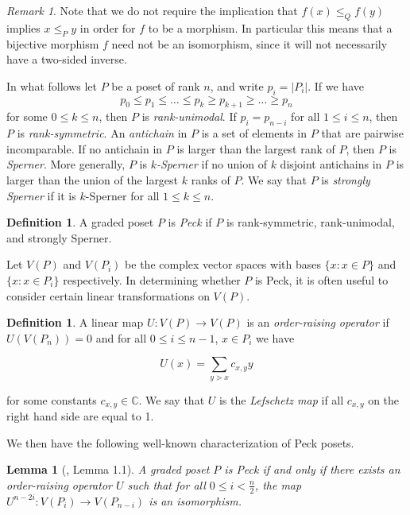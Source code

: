 \documentclass[smallextended, envcountsame, numbook]{svjour3}
\theoremstyle{plain}
\newtheorem{lem}[thm]{Lemma}
\theoremstyle{definition}
\newtheorem{defn}[thm]{Definition}
\theoremstyle{remark}
\newtheorem{rmk}[thm]{Remark}
\numberwithin{equation}{section}
\begin{document}
\begin{rmk}\label{rem:bijective_morphism_not_isomorphism}
Note that we do not require the implication that $f(x)\le_Q f(y)$ implies $x\le_P y$ in order for $f$ to be a morphism.  In particular this means that a bijective morphism $f$ need not be an isomorphism, since it will not necessarily have a two-sided inverse.  
\end{rmk}


In what follows let $P$ be a poset of rank $n$, and write $p_i = |P_i|$.  If we have
$$p_0\le p_1\le \ldots \le p_k \ge p_{k+1} \ge\ldots \ge p_n$$
for some $0\le k\le n$, then $P$ is \textit{rank-unimodal}. If $p_i = p_{n-i}$ for all $1\le i\le n$, then $P$ is \textit{rank-symmetric}.  An \textit{antichain} in $P$ is a set of elements in $P$ that are pairwise incomparable.  If no antichain in $P$ is larger than the largest rank of $P$, then $P$ is \textit{Sperner}.  More generally, $P$ is \textit{$k$-Sperner} if no union of $k$ disjoint antichains in $P$ is larger than the union of the largest $k$ ranks of $P$. We say that $P$ is \textit{strongly Sperner} if it is $k$-Sperner for all $1\le k\le n$.

\begin{defn}
	\label{defn:peck}
A graded poset $P$ is \textit{Peck} if $P$ is rank-symmetric, rank-unimodal, and strongly Sperner.
\end{defn}


Let $V(P)$ and $V(P_i)$ be the complex vector spaces with bases $\{x :x\in P\}$ and $\{x :x\in P_i\}$ respectively. In determining whether $P$ is Peck, it is often useful to consider certain linear transformations on $V(P)$.

\begin{defn}
\label{defn:lefschetz}
A linear map $U\colon V(P)\rightarrow V(P)$ is an \textit{order-raising operator} if $U(V(P_n)) = 0$ and for all $0\le i\le n-1$, $x\in P_i$ we have

$$U(x) = \sum_{y\gtrdot x} c_{x,y}y$$

\noindent for some constants $c_{x,y}\in \mathbb{C}$.  We say that $U$ is the \textit{Lefschetz map} if all $c_{x,y}$ on the right hand side are equal to 1.
\end{defn}

\noindent We then have the following well-known characterization of Peck posets.

\begin{lem}[\cite{weyl_groups_stanley}, Lemma 1.1]\label{lem:Peck_poset_characterization}
A graded poset $P$ is Peck if and only if there exists an order-raising operator $U$ such that for all $0\le i < \frac{n}{2}$, the map $U^{n-2i}\colon V(P_i)\rightarrow V(P_{n-i})$ is an isomorphism.
\end{lem}
\end{document}
